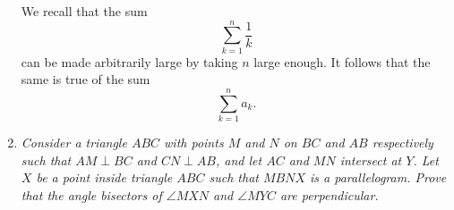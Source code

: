 \documentclass{article}
\begin{document}
\begin{enumerate}[1.]
We recall that the sum
\[
	\sum_{k=1}^{n} \frac{1}{k}
\]
can be made arbitrarily large by taking $n$ large enough. It follows that the same is true of the sum
\[
	\sum_{k=1}^{n} a_k.	
\]



\vspace{24pt}
\item %
{\itshape Consider a triangle $ABC$ with points $M$ and $N$ on $BC$ and $AB$ respectively such that $AM \perp BC$ and $CN \perp AB$, and let $AC$ and $MN$ intersect at $Y$.
Let $X$ be a point inside triangle $ABC$ such that $MBNX$ is a parallelogram.
Prove that the angle bisectors of $\angle MXN$ and $\angle MYC$ are perpendicular.}


\end{enumerate}
\end{document}
